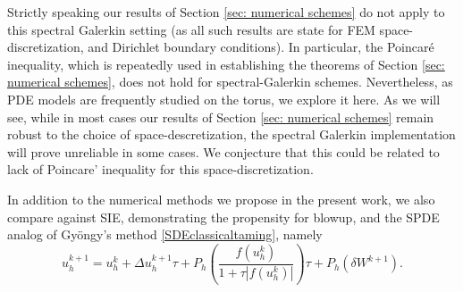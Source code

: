 \documentclass[reqno, 11pt]{amsart}
\theoremstyle{plain}
\theoremstyle{definition}
\theoremstyle{remark}
\numberwithin{equation}{section}
\numberwithin{theorem}{section}
\begin{document}
{ %





 
 Strictly speaking our results of Section \ref{sec: numerical schemes} do not apply to this spectral Galerkin setting (as all such results are state for FEM space-discretization, and Dirichlet boundary conditions). In particular, the Poincaré inequality,  which is repeatedly used in establishing the theorems of Section \ref{sec: numerical schemes},  {does not hold for spectral-Galerkin schemes.}  Nevertheless, as PDE models are frequently studied on the torus, we explore it here. {As we will see, while in most cases our results of Section \ref{sec: numerical schemes} remain robust to the choice of space-descretization,  the spectral Galerkin implementation will prove unreliable in some cases. We conjecture that this could be related  to lack of Poincare' inequality for this space-discretization. } 
 
 



In addition to the numerical methods we propose in the present work, we also compare against SIE, demonstrating the propensity for blowup, and the SPDE analog of Gy\"ongy's method \eqref{SDEclassicaltaming},  namely 
\begin{equation}
\label{e:gyongyspde}
    u_h^{k+1} = u_h^k + \Delta u_h^{k+1}\tau + P_{h}\left(\frac{f(u_h^k)}{1+\tau|f(u_h^k)|}\right)\tau + P_h(\delta W^{k+1}).
\end{equation}

}
\end{document}
